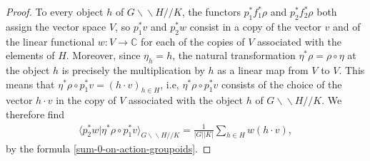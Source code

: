 \documentclass[12pt]{scrartcl}
\theoremstyle{definition}
\numberwithin{equation}{section}
\numberwithin{definition}{section}
\numberwithin{figure}{section}
\begin{document}
\begin{proof}
To every object $h$ of $G\backslash\!\backslash H/\!/K$, the functors $p_1^*f_1^*\rho$ and $p_2^*f_2^*\rho$ both assign the vector space $V$, so $p_1^*v$ and $p_2^*w$ consist in a copy of the vector $v$ and of the linear functional $w\colon V\to \mathbb{C}$ for each of the copies of $V$ associated with the elements of $H$. Moreover, since $\eta_h=h$, the natural transformation $\eta^*\rho=\rho\circ\eta$ at the object $h$ is precisely the multiplication by $h$ as a linear map from $V$ to $V$. This means that $\eta^*\rho\circ p_1^*v=(h\cdot v)_{h\in H}$, i.e, $\eta^*\rho\circ p_1^*v$  consists of the choice of the vector $h\cdot v$ in the copy of $V$ associated with the object $h$ of $G\backslash\!\backslash H/\!/K$. We therefore find
\begin{align*}
\langle p_2^*w|\eta^*\rho\circ p_1^*v\rangle_{G\backslash\!\backslash H/\!/K}=\frac{1}{|G||K|}\sum_{h\in H}w(h\cdot v),
\end{align*}
by the formula \eqref{sum-0-on-action-groupoids}.
\end{proof}
\end{document}
